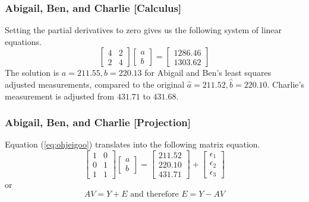 \documentclass[xcolor=dvipsnames]{beamer}
\begin{document}
\begin{frame}
  \frametitle{Abigail, Ben, and Charlie [Calculus]}
  Setting the partial derivatives to zero gives us the following
  system of linear equations.
  \begin{equation}
    \label{eq:megioquo}
    \left[
      \begin{array}{cc}
        4 & 2 \\
        2 & 4
      \end{array}\right]\left[
      \begin{array}{c}
        a \\
        b
      \end{array}\right]=\left[
      \begin{array}{c}
        1286.46 \\
        1303.62
      \end{array}\right]
  \end{equation}
The solution is $a=211.55,b=220.13$ for Abigail and Ben's least
squares adjusted measurements, compared to the original
$\hat{a}=211.52,\hat{b}=220.10$. Charlie's measurement is adjusted
from $431.71$ to $431.68$. 
\end{frame}

\begin{frame}
  \frametitle{Abigail, Ben, and Charlie [Projection]}
  Equation (\ref{eq:ohjeigoo}) translates into the following matrix
  equation.
  \begin{equation}
    \label{eq:eiwiepho}
    \left[
      \begin{array}{cc}
        1 & 0 \\
        0 & 1 \\
        1 & 1 
      \end{array}\right]\left[
      \begin{array}{c}
        a \\
        b
      \end{array}\right]=\left[
      \begin{array}{c}
        211.52 \\
        220.10 \\
        431.71
      \end{array}\right]+\left[
      \begin{array}{c}
        \epsilon_{1} \\
        \epsilon_{2} \\
        \epsilon_{3}
      \end{array}\right]
  \end{equation}
  or
  \begin{equation}
    \label{eq:quahyawi}
    AV=Y+E\mbox{ and therefore }E=Y-AV
  \end{equation}
\end{frame}
\end{document}
